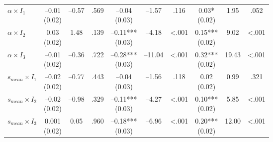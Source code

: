 \documentclass[
  11pt,
]{article}
\begin{document}
\begin{spacing}{1.1}
\begin{ThreePartTable}
\begin{longtable}[t]{>{\raggedright\arraybackslash}p{0.7in}ccccccccc}
$\alpha \times I_1$ & \makecell[c]{–0.01\\(0.02)} & –0.57 & .569 & \makecell[c]{–0.04\\(0.03)} & –1.57 & .116 & \makecell[c]{0.03*\\(0.02)} & 1.95 & .052 \\
$\alpha \times I_2$ & \makecell[c]{0.03\\(0.02)} & 1.48 & .139 & \makecell[c]{–0.11***\\(0.03)} & –4.18 & <.001 & \makecell[c]{0.15***\\(0.02)} & 9.02 & <.001\\
$\alpha \times I_3$ & \makecell[c]{–0.01\\(0.02)} & –0.36 & .722 & \makecell[c]{–0.28***\\(0.03)} & –11.04 & <.001 & \makecell[c]{0.32***\\(0.02)} & 19.43 & <.001 \\
$s_{mean} \times I_1$ & \makecell[c]{–0.02\\(0.02)} & –0.77 & .443 & \makecell[c]{–0.04\\(0.03)} & –1.56 & .118 & \makecell[c]{0.02\\(0.02)} & 0.99 & .321 \\
$s_{mean} \times I_2$ & \makecell[c]{–0.02\\(0.02)} & –0.98 & .329 & \makecell[c]{–0.11***\\(0.03)} & –4.27 & <.001 & \makecell[c]{0.10***\\(0.02)} & 5.85 & <.001 \\
$s_{mean} \times I_3$ & \makecell[c]{0.001\\(0.02)} & 0.05 & .960 & \makecell[c]{–0.18***\\(0.03)} & –6.96 & <.001 & \makecell[c]{0.20***\\(0.02)} & 12.00 & <.001 \\*
\end{longtable}
\end{ThreePartTable}
\label{tab:3}
\end{spacing}
\end{document}
